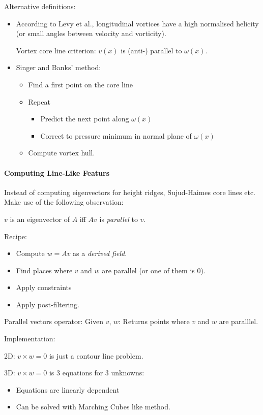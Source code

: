 Alternative definitions:
\begin{itemize}
    \item According to Levy et al., longitudinal vortices have a high normalised helicity (or small angles between velocity and vorticity).
    
        Vortex core line criterion: $v(x)$ is (anti-) parallel to $\omega (x)$.
        
    \item Singer and Banks' method:
    
        \begin{itemize}
            \item Find a first point on the core line
            \item Repeat
                \begin{itemize}
                    \item Predict the next point along $\omega (x)$
                    \item Correct to pressure minimum in normal plane of $\omega(x)$
                \end{itemize}
            \item Compute vortex hull.
        \end{itemize}
\end{itemize}

\paragraph{Computing Line-Like Featurs} Instead of computing eigenvectors for height ridges, Sujud-Haimes core lines etc. Make use of the following observation:

$v$ is an eigenvector of $A$ iff $Av$ is \emph{parallel} to $v$.

Recipe:
\begin{itemize}
    \item Compute $w = Av$ as a \emph{derived field}.
    \item Find places where $v$ and $w$ are parallel (or one of them is $0$).
    \item Apply constraints
    \item Apply post-filtering.
\end{itemize}

Parallel vectors operator: Given $v$, $w$: Returns points where $v$ and $w$ are paralllel.

Implementation:
\begin{description}
    \item 2D: $v\times w =0 $ is just a contour line problem.
    \item 3D: $v\times w=0$ is 3 equations for 3 unknowns:
        \begin{itemize}
            \item Equations are linearly dependent
            \item Can be solved with Marching Cubes like method.
        \end{itemize}
 
\end{description}


